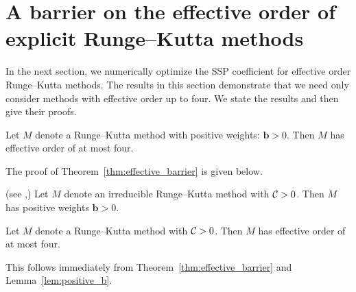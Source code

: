 \section{A barrier on the effective order of explicit Runge--Kutta methods}\label{sec:ExRK_barrier}
In the next section, we numerically optimize the SSP coefficient for effective 
order Runge--Kutta methods.
The results in this section demonstrate that we need only consider methods 
with effective order up to four. 
We state the results and then give their proofs.


\begin{theorem}\label{thm:effective_barrier}
	Let $M$ denote a Runge--Kutta method with positive weights: $\bm{b}>0$.
    Then $M$ has effective order of at most four.
\end{theorem}
The proof of Theorem~\ref{thm:effective_barrier} is given below.

\begin{lemma}\label{lem:positive_b}(see \cite[Theorem~4.2]{Kraaijevanger1991},\cite[Lemma 4.2]{Ruuth2002})
	Let $M$ denote an irreducible Runge--Kutta method with $\mathcal{C}>0$. 
	Then $M$ has positive weights $\bm{b}>0$.
\end{lemma}

\begin{corollary}\label{cor:no_SSP_5}
	Let $M$ denote a Runge--Kutta method with $\mathcal{C}>0$.
    Then $M$ has effective order of at most four.
\end{corollary}
This follows immediately from Theorem~\ref{thm:effective_barrier} and 
Lemma~\ref{lem:positive_b}.

